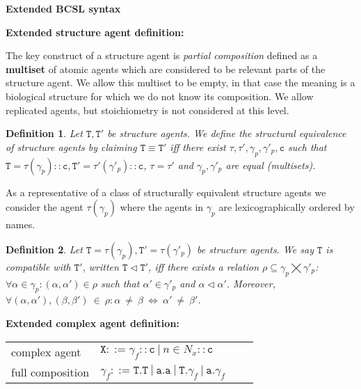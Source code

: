\documentclass[12pt]{article}
\newtheorem{mydef}{Definition}
\newcommand{\mysection}[1]{{\newpage\centering\Large\textbf{#1}\\}\normalsize\vspace{0.5cm}}
\newcommand{\mysmallsection}[1]{\vspace{0.5cm}\large\textbf{#1}\normalsize\vspace{0.5cm}}
\begin{document}
\mysection{Extended BCSL syntax}

\mysmallsection{Extended structure agent definition:}

The key construct of a structure agent is \emph{partial composition} defined as a \textbf{multiset} of atomic agents which are considered to be relevant parts of the structure agent. We allow this multiset to be empty, in that case the meaning is a biological structure for which we do not know its composition. We allow replicated agents, but stoichiometry is not considered at this level.

\begin{mydef}
Let $\mathtt{T},\mathtt{T}'$ be structure agents. We define the \emph{structural equivalence of structure agents} by claiming $\mathtt{T}\equiv\mathtt{T}'$ iff there exist $\tau,\tau',\gamma_p,\gamma'_p,\mathtt{c}$ such that $\mathtt{T}=\tau(\gamma_p)::\mathtt{c},\mathtt{T}'=\tau'(\gamma'_p)::\mathtt{c}$, $\tau=\tau'$ and $\gamma_p,\gamma'_p$ are equal (multisets).
\end{mydef}

As a representative of a class of structurally equivalent structure agents we consider the agent $\mathtt{\tau}(\gamma_p)$ where the agents in $\gamma_p$ are lexicographically ordered by names.

\begin{mydef}
Let $\mathtt{T} = \tau(\gamma_p),\mathtt{T}' = \tau(\gamma'_p)$ be structure agents. We say $\mathtt{T}$ \emph{is compatible with} $\mathtt{T}'$, written $\mathtt{T} \lhd \mathtt{T}'$, iff there exists a relation $\rho \subseteq \gamma_p \bigtimes \gamma'_p $: $\forall \alpha \in \gamma_p: (\alpha, \alpha') \in \rho$ such that $\alpha' \in \gamma'_p$ and $\alpha \lhd \alpha'$. Moreover, $\forall (\alpha, \alpha'), (\beta, \beta')~\in~\rho: \alpha~\neq~\beta~\Leftrightarrow~\alpha'~\neq~\beta' $.
\end{mydef}

\mysmallsection{Extended complex agent definition:}

\begin{center}
{\small
\hspace*{-1 cm}\begin{tabular}{ ll ll }
 complex agent & $\mathtt{X}::=\gamma_f::\mathtt{c}~|~n\in{N}_{x}::\mathtt{c}$\\
 full composition & $\gamma_f ::= \mathtt{T}.\mathtt{T}~|~\mathtt{a}.\mathtt{a}~|~\mathtt{T}.\gamma_{f}~|~\mathtt{a}.\gamma_{f}$
\end{tabular}
}
\end{center}
\end{document}
